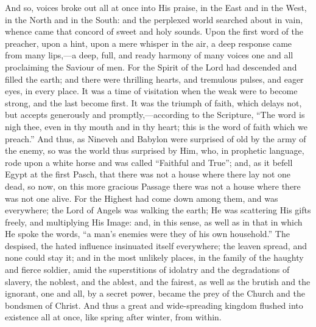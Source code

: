 And so, voices broke out all at once into His praise,
in the East and in the West, in the North and in the
South: and the perplexed world searched about in vain,
whence came that concord of sweet and holy sounds. Upon
the first word of the preacher, upon a hint, upon a mere
whisper in the air, a deep response came from many
lips,—a deep, full, and ready harmony of many voices
one and all proclaiming the Saviour of men. For the
Spirit of the Lord had descended and filled the earth;
and there were thrilling hearts, and tremulous pulses,
and eager eyes, in every place. It was a time of
visitation when the weak were to become strong, and the
last become first. It was the triumph of faith, which
delays not, but accepts generously and
promptly,—according to the Scripture, ``The word
is nigh thee, even in thy mouth and in thy heart; this is
the word of faith which we preach.'' And thus, as
Nineveh and Babylon were surprised of old by the army of
the enemy, so was the world thus surprised by Him, who,
in prophetic language, rode upon a white horse and was
called ``Faithful and True''; and, as it befell
Egypt at the first Pasch, that there was not a house
where there lay not one dead, so now, on this more
gracious Passage there was not a house where there was
not one alive. For the Highest had come down among them,
and was everywhere; the Lord of Angels was walking the
earth; He was scattering His gifts freely, and
multiplying His Image: and, in this sense, as well as in
that in which He spoke the words, ``a man's enemies
were they of his own household.'' The despised, the
hated influence insinuated itself everywhere; the leaven
spread, and none could stay it; and in the most unlikely
places, in the family of the haughty and fierce soldier,
amid the superstitions of idolatry and the degradations
of slavery, the noblest, and the ablest, and the fairest,
as well as the brutish and the ignorant, one and all, by
a secret power, became the prey of the Church and the
bondsmen of Christ. And thus a great and wide-spreading
kingdom flushed into existence all at once, like spring
after winter, from within.

